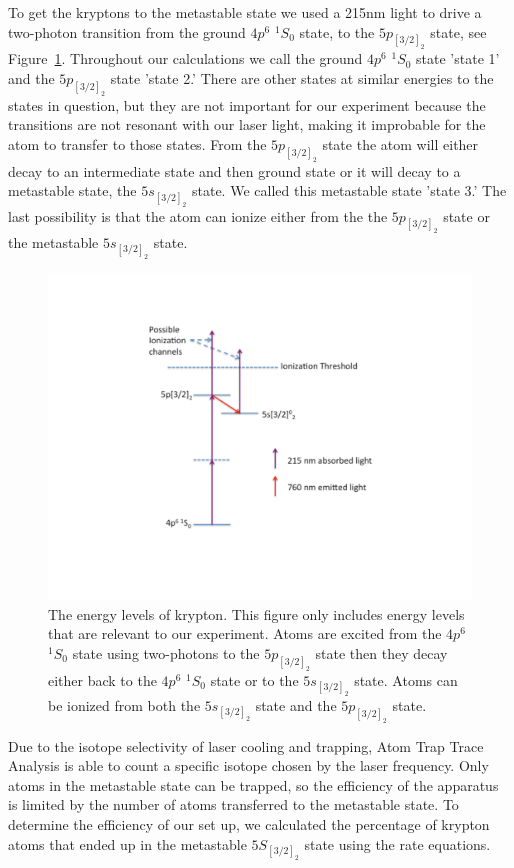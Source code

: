 \documentclass[prb,preprint]{revtex4-1}
\begin{document}
To get the kryptons to the metastable state we used a 215nm light to drive a two-photon transition from the ground $4p^6$ $^1S_0$ state, to the $5p_{[3/2]_2}$ state, see Figure~\ref{KrEnergyLevels}. Throughout our calculations we call the ground $4p^6$ $^1S_0$ state 'state 1' and the $5p_{[3/2]_2}$ state 'state 2.' There are other states at similar energies to the states in question, but they are not important for our experiment because the transitions are not resonant with our laser light, making it improbable for the atom to transfer to those states. From the $5p_{[3/2]_2}$ state the atom will either decay to an intermediate state and then ground state or it will decay to a metastable state, the $5s_{[3/2]_2}$ state. We called this metastable state 'state 3.' The last possibility is that the atom can ionize either from the the $5p_{[3/2]_2}$ state or the metastable $5s_{[3/2]_2}$ state. 

\begin{figure}[h!]
\centering
\includegraphics[width=6in]{KrEnergyLevels.pdf}
\caption{The energy levels of krypton. This figure only includes energy levels that are relevant to our experiment. Atoms are excited from the $4p^6$ $^1S_0$ state using two-photons to the $5p_{[3/2]_2}$ state then they decay either back to the $4p^6$ $^1S_0$ state or to the $5s_{[3/2]_2}$ state. Atoms can be ionized from both the $5s_{[3/2]_2}$ state and the $5p_{[3/2]_2}$ state.}
\label{KrEnergyLevels}
\end{figure}

Due to the isotope selectivity of laser cooling and trapping, Atom Trap Trace Analysis is able to count a specific isotope chosen by the laser frequency.  Only atoms in the metastable state can be trapped, so the efficiency of the apparatus is limited by the number of atoms transferred to the metastable state. To determine the efficiency of our set up, we calculated the percentage of krypton atoms that ended up in the metastable $5S_{[3/2]_2}$ state using the rate equations.
\end{document}
